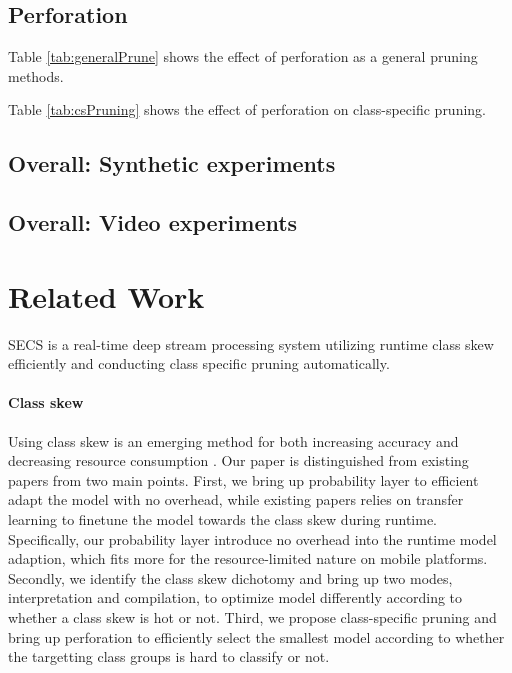 \documentclass[pageno]{jpaper}
\begin{document}
\subsection{Perforation}
Table \ref{tab:generalPrune} shows the effect of perforation as a general pruning methods.

Table \ref{tab:csPruning} shows the effect of perforation on class-specific pruning.

\subsection{Overall: Synthetic experiments}


\subsection{Overall: Video experiments}


\newpage
\clearpage
\section{Related Work} \label{relatedWork}
SECS is a real-time deep stream processing system utilizing runtime class skew efficiently and conducting class specific pruning automatically.

\paragraph{Class skew}
Using class skew is an emerging method for both increasing accuracy and decreasing resource consumption \cite{han2016mcdnn, kang2017noscope, shen2016fast}. Our paper is distinguished from existing papers from two main points. First, we bring up probability layer to efficient adapt the model with no overhead, while existing papers relies on transfer learning to finetune the model towards the class skew during runtime. Specifically, our probability layer introduce no overhead into the runtime model adaption, which fits more for the resource-limited nature on mobile platforms. Secondly, we identify the class skew dichotomy and bring up two modes, interpretation and compilation, to optimize model differently according to whether a class skew is hot or not. Third, we propose class-specific pruning and bring up perforation to efficiently select the smallest model according to whether the targetting class groups is hard to classify or not.


\end{document}
